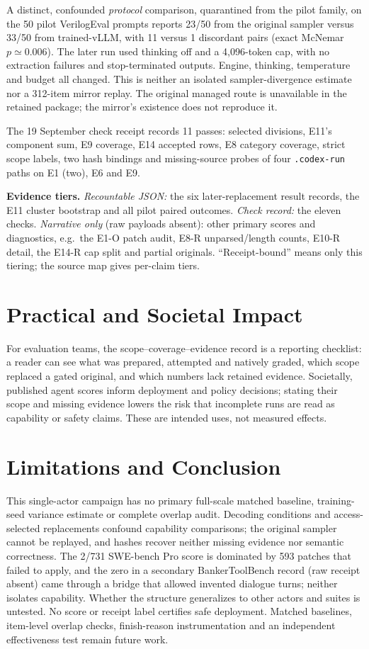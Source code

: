 \documentclass[a4paper,runningheads]{llncs}
\begin{document}
A distinct, confounded \emph{protocol} comparison, quarantined from the pilot
family, on the 50 pilot VerilogEval prompts
reports 23/50 from the original sampler versus 33/50 from trained-vLLM,
with 11 versus 1 discordant pairs (exact McNemar $p\simeq0.006$).
The later run used thinking off and a 4,096-token cap, with no extraction
failures and stop-terminated outputs. Engine, thinking, temperature and budget
all changed. This is neither an isolated sampler-divergence estimate nor a
312-item mirror replay. The original managed route is unavailable in the
retained package; the mirror's existence does not reproduce it.

The 19 September check receipt records 11 passes: selected divisions, E11's
component sum, E9 coverage, E14 accepted rows, E8 category coverage, strict
scope labels, two hash bindings and missing-source probes of four
\texttt{.codex-run} paths on E1 (two), E6 and E9.

\textbf{Evidence tiers.} \emph{Recountable JSON:} the six later-replacement
result records, the E11 cluster bootstrap and all pilot paired outcomes.
\emph{Check record:} the eleven checks. \emph{Narrative only} (raw payloads
absent): other primary scores and diagnostics, e.g.\ the E1-O patch audit,
E8-R unparsed/length counts, E10-R detail, the E14-R cap split and partial
originals. ``Receipt-bound'' means only this tiering; the source map gives
per-claim tiers.

\section{Practical and Societal Impact}
For evaluation teams, the scope--coverage--evidence record is a reporting
checklist: a reader can see what was prepared, attempted and natively graded,
which scope replaced a gated original, and which numbers lack retained
evidence. Societally,
published agent scores inform deployment and policy decisions; stating their
scope and missing evidence lowers the risk that incomplete runs are read as
capability or safety claims. These are intended uses, not measured effects.

\section{Limitations and Conclusion}
This single-actor campaign has no primary full-scale matched baseline,
training-seed variance estimate or complete overlap audit. Decoding conditions
and access-selected replacements confound capability comparisons; the original
sampler cannot be replayed, and hashes recover neither missing evidence nor
semantic correctness. The 2/731 SWE-bench Pro score is dominated by 593
patches that failed to apply, and the zero in a secondary BankerToolBench record (raw
receipt absent) came through a bridge that allowed invented dialogue turns; neither isolates capability.
Whether the structure generalizes to other actors and suites is untested. No score or receipt label
certifies safe deployment. Matched baselines, item-level overlap
checks, finish-reason instrumentation and an independent effectiveness test
remain future work.
\end{document}
